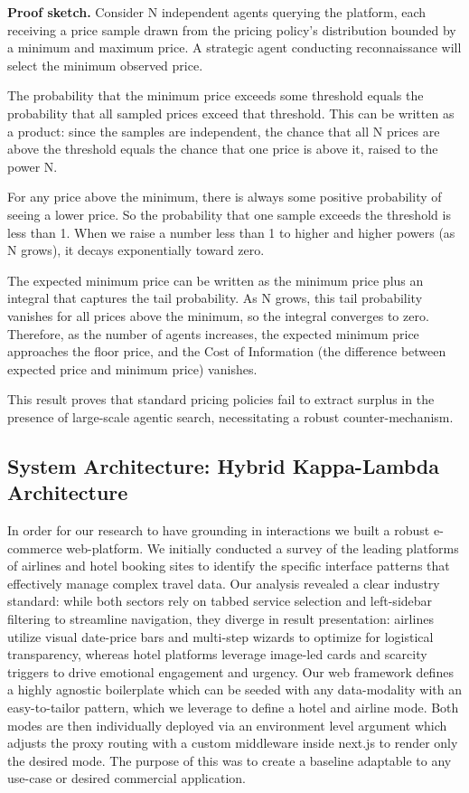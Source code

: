 \textbf{Proof sketch.} Consider N independent agents querying the platform, each receiving a price sample drawn from the pricing policy's distribution bounded by a minimum and maximum price. A strategic agent conducting reconnaissance will select the minimum observed price.

The probability that the minimum price exceeds some threshold equals the probability that all sampled prices exceed that threshold. This can be written as a product: since the samples are independent, the chance that all N prices are above the threshold equals the chance that one price is above it, raised to the power N.

For any price above the minimum, there is always some positive probability of seeing a lower price. So the probability that one sample exceeds the threshold is less than 1. When we raise a number less than 1 to higher and higher powers (as N grows), it decays exponentially toward zero.

The expected minimum price can be written as the minimum price plus an integral that captures the tail probability. As N grows, this tail probability vanishes for all prices above the minimum, so the integral converges to zero. Therefore, as the number of agents increases, the expected minimum price approaches the floor price, and the Cost of Information (the difference between expected price and minimum price) vanishes.

This result proves that standard pricing policies fail to extract surplus in the presence of large-scale agentic search, necessitating a robust counter-mechanism.

\subsection{System Architecture: Hybrid Kappa-Lambda Architecture}

In order for our research to have grounding in interactions we built a robust e-commerce web-platform. We initially conducted a survey of the leading platforms of airlines and hotel booking sites to identify the specific interface patterns that effectively manage complex travel data. Our analysis revealed a clear industry standard: while both sectors rely on tabbed service selection and left-sidebar filtering to streamline navigation, they diverge in result presentation: airlines utilize visual date-price bars and multi-step wizards to optimize for logistical transparency, whereas hotel platforms leverage image-led cards and scarcity triggers to drive emotional engagement and urgency. Our web framework defines a highly agnostic boilerplate which can be seeded with any data-modality with an easy-to-tailor pattern, which we leverage to define a hotel and airline mode. Both modes are then individually deployed via an environment level argument which adjusts the proxy routing with a custom middleware inside next.js to render only the desired mode. The purpose of this was to create a baseline adaptable to any use-case or desired commercial application.


